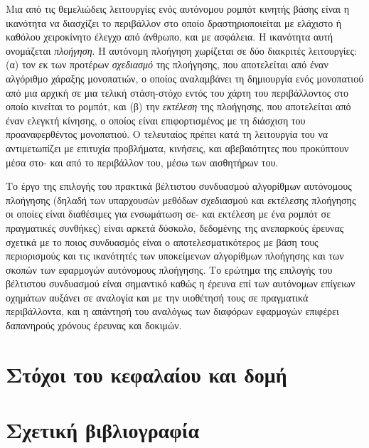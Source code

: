 Μια από τις θεμελιώδεις λειτουργίες ενός αυτόνομου ρομπότ κινητής βάσης είναι η
ικανότητα να διασχίζει το περιβάλλον στο οποίο δραστηριοποιείται με ελάχιστο ή
καθόλου χειροκίνητο έλεγχο από άνθρωπο, και με ασφάλεια. Η ικανότητα αυτή
ονομάζεται \textit{πλοήγηση}. Η αυτόνομη πλοήγηση χωρίζεται σε δύο διακριτές
λειτουργίες: (α) τον εκ των προτέρων \textit{σχεδιασμό} της πλοήγησης, που
αποτελείται από έναν αλγόριθμο χάραξης μονοπατιών, ο οποίος αναλαμβάνει τη
δημιουργία ενός μονοπατιού από μια αρχική σε μια τελική στάση-στόχο εντός του
χάρτη του περιβάλλοντος στο οποίο κινείται το ρομπότ, και (β) την
\textit{εκτέλεση} της πλοήγησης, που αποτελείται από έναν ελεγκτή κίνησης, ο
οποίος είναι επιφορτισμένος με τη διάσχιση του προαναφερθέντος μονοπατιού. Ο
τελευταίος πρέπει κατά τη λειτουργία του να αντιμετωπίζει με επιτυχία
προβλήματα, κινήσεις, και αβεβαιότητες που προκύπτουν μέσα στο- και από το
περιβάλλον του, μέσω των αισθητήρων του.

Το έργο της επιλογής του πρακτικά βέλτιστου συνδυασμού αλγορίθμων αυτόνομους
πλοήγησης (δηλαδή των υπαρχουσών μεθόδων σχεδιασμού και εκτέλεσης πλοήγησης οι
οποίες είναι διαθέσιμες για ενσωμάτωση σε- και εκτέλεση με ένα ρομπότ σε
πραγματικές συνθήκες) είναι αρκετά δύσκολο, δεδομένης της ανεπαρκούς έρευνας
σχετικά με το ποιος συνδυασμός είναι ο αποτελεσματικότερος με βάση τους
περιορισμούς και τις ικανότητές των υποκείμενων αλγορίθμων πλοήγησης και των
σκοπών των εφαρμογών αυτόνομους πλοήγησης. Το ερώτημα της επιλογής του
βέλτιστου συνδυασμού είναι σημαντικό καθώς η έρευνα επί των αυτόνομων επίγειων
οχημάτων αυξάνει σε αναλογία και με την υιοθέτησή τους σε πραγματικά
περιβάλλοντα, και η απάντησή του αναλόγως των διαφόρων εφαρμογών επιφέρει
δαπανηρούς χρόνους έρευνας και δοκιμών.

\section{Στόχοι του κεφαλαίου και δομή}
  \label{section:02_01_01}
  

\section{Σχετική βιβλιογραφία}
  \label{section:02_01_02}
  

